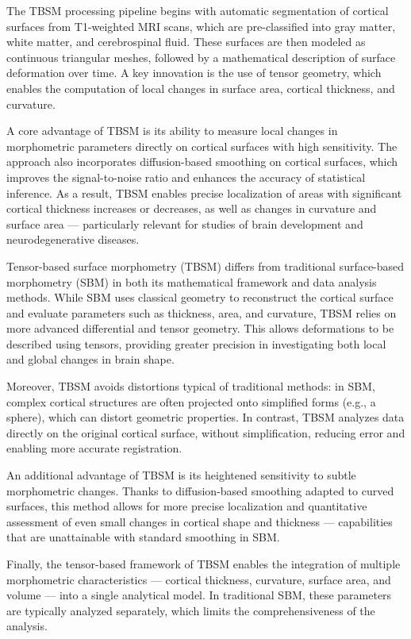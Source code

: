 \documentclass[default]{subfiles}
\begin{document}
The TBSM processing pipeline begins with automatic segmentation of cortical surfaces from T1-weighted MRI scans, which
are pre-classified into gray matter, white matter, and cerebrospinal fluid. These surfaces are then modeled as
continuous triangular meshes, followed by a mathematical description of surface deformation over time. A key
innovation is the use of tensor geometry, which enables the computation of local changes in surface area, cortical
thickness, and curvature.

A core advantage of TBSM is its ability to measure local changes in morphometric parameters directly on cortical
surfaces with high sensitivity. The approach also incorporates diffusion-based smoothing on cortical surfaces, which
improves the signal-to-noise ratio and enhances the accuracy of statistical inference. As a result, TBSM enables
precise localization of areas with significant cortical thickness increases or decreases, as well as changes in
curvature and surface area — particularly relevant for studies of brain development and neurodegenerative diseases.

Tensor-based surface morphometry (TBSM) differs from traditional surface-based morphometry (SBM) in both its
mathematical framework and data analysis methods. While SBM uses classical geometry to reconstruct the cortical
surface and evaluate parameters such as thickness, area, and curvature, TBSM relies on more advanced differential
and tensor geometry. This allows deformations to be described using tensors, providing greater precision in
investigating both local and global changes in brain shape.

Moreover, TBSM avoids distortions typical of traditional methods: in SBM, complex cortical structures are often
projected onto simplified forms (e.g., a sphere), which can distort geometric properties. In contrast, TBSM analyzes
data directly on the original cortical surface, without simplification, reducing error and enabling more accurate
registration.

An additional advantage of TBSM is its heightened sensitivity to subtle morphometric changes. Thanks to diffusion-based
smoothing adapted to curved surfaces, this method allows for more precise localization and quantitative assessment of
even small changes in cortical shape and thickness — capabilities that are unattainable with standard smoothing in SBM.

Finally, the tensor-based framework of TBSM enables the integration of multiple morphometric characteristics — cortical
thickness, curvature, surface area, and volume — into a single analytical model. In traditional SBM, these parameters
are typically analyzed separately, which limits the comprehensiveness of the analysis.
\end{document}
